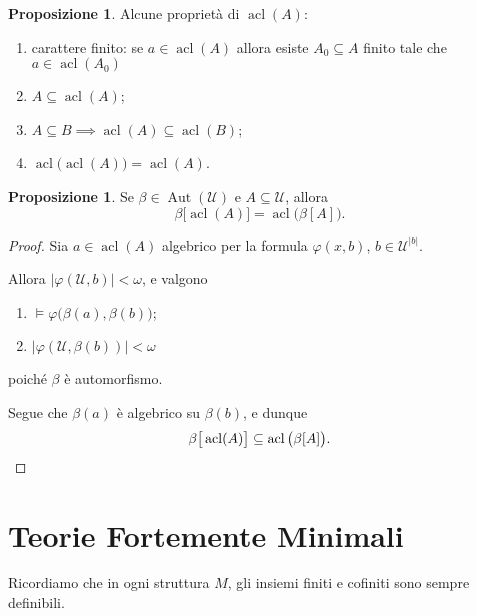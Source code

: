 \documentclass[10pt]{article}
\newcommand{\card}[1]{\left\vert #1 \right\vert}
\newcommand{\1}{\mathds{1}}
\theoremstyle{definition}%
\newtheorem{prop}[thm]{Proposizione}
\theoremstyle{plain}
\theoremstyle{remark}
\begin{document}
\begin{prop}
Alcune proprietà di \(\operatorname{acl}(A)\):
\begin{enumerate}
\item carattere finito: se \(a \in \operatorname{acl}(A)\) allora esiste \(A_{0} \subseteq A\) finito tale che \(a \in \operatorname{acl}(A_{0})\)
\item \(A \subseteq \operatorname{acl}(A)\);
\item \(A \subseteq B\implies \operatorname{acl}(A) \subseteq \operatorname{acl}(B)\);
\item \(\operatorname{acl}\big(\operatorname{acl}(A)\big)=\operatorname{acl}(A)\).
\end{enumerate}
\end{prop}

\begin{prop}
Se \(\beta \in \operatorname{Aut}(\mathcal{U})\) e \(A \subseteq \mathcal{U}\), allora
\begin{equation*}
\beta\big[\operatorname{acl}(A)\big] = \operatorname{acl}\big(\beta[A]\big).
\end{equation*}
\end{prop}
\begin{proof}
Sia \(a \in \operatorname{acl}(A)\) algebrico per la formula \(\varphi(x,b)\), \(b \in \mathcal{U}^{|b|}\).

Allora \(\card{\varphi(\mathcal{U},b)}<\omega\), e valgono
\begin{enumerate}
\item \(\vDash\varphi\big(\beta(a),\beta(b)\big)\);
\item \(\card{\varphi(\mathcal{U},\beta(b))}<\omega\)
\end{enumerate}
poiché \(\beta\) è automorfismo.

Segue che \(\beta(a)\) è algebrico su \(\beta(b)\), e dunque
\begin{equation*}
\beta\big[\operatorname{acl}(A)\big] \subseteq \operatorname{acl}\big(\beta[A]\big).\qedhere
\end{equation*}
\end{proof}
\section{Teorie Fortemente Minimali}
\label{sec:org98ed2af}

Ricordiamo che in ogni struttura \(M\), gli insiemi finiti e cofiniti sono sempre definibili.
\end{document}
